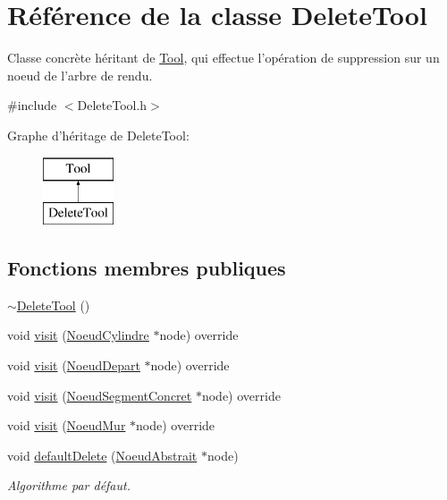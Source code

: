 \hypertarget{class_delete_tool}{\section{Référence de la classe Delete\-Tool}
\label{class_delete_tool}
}


Classe concrète héritant de \hyperlink{class_tool}{Tool}, qui effectue l'opération de suppression sur un noeud de l'arbre de rendu.  




{\ttfamily \#include $<$Delete\-Tool.\-h$>$}

Graphe d'héritage de Delete\-Tool\-:\begin{figure}[H]
\begin{center}
\leavevmode
\includegraphics[height=2.000000cm]{class_delete_tool}
\end{center}
\end{figure}
\subsection*{Fonctions membres publiques}
\begin{DoxyCompactItemize}
\item 
\hyperlink{group__inf2990_ga4a54f710ae3ca5e4eb8e16610d07c3bc}{$\sim$\-Delete\-Tool} ()
\item 
void \hyperlink{group__inf2990_gaf91f134881ce52596486855f405e8f96}{visit} (\hyperlink{class_noeud_cylindre}{Noeud\-Cylindre} $\ast$node) override
\item 
void \hyperlink{group__inf2990_ga9efc126da05a809724a3a2597ac4cb57}{visit} (\hyperlink{class_noeud_depart}{Noeud\-Depart} $\ast$node) override
\item 
void \hyperlink{group__inf2990_ga1908b4ee57bb2dfbf4022412b48470d8}{visit} (\hyperlink{class_noeud_segment_concret}{Noeud\-Segment\-Concret} $\ast$node) override
\item 
void \hyperlink{group__inf2990_ga816147276bc393b0552e031441541726}{visit} (\hyperlink{class_noeud_mur}{Noeud\-Mur} $\ast$node) override
\item 
void \hyperlink{group__inf2990_gab16541bc54ef7e060c56d59d64798805}{default\-Delete} (\hyperlink{class_noeud_abstrait}{Noeud\-Abstrait} $\ast$node)
\begin{DoxyCompactList}\small\item\em Algorithme par défaut. \end{DoxyCompactList}\end{DoxyCompactItemize}


